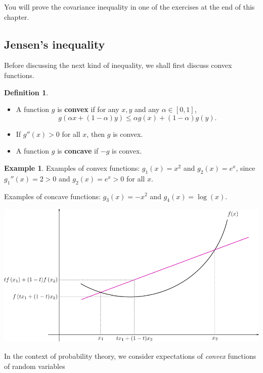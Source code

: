 \documentclass[
]{book}
\theoremstyle{definition}
\newtheorem{definition}{Definition}[chapter]
\theoremstyle{definition}
\newtheorem{example}{Example}[chapter]
\theoremstyle{definition}
\theoremstyle{definition}
\theoremstyle{remark}
\begin{document}
You will prove the covariance inequality in one of the exercises at the end of this chapter.

\hypertarget{jensens-inequality}{%
\subsection{Jensen's inequality}\label{jensens-inequality}}

Before discussing the next kind of inequality, we shall first discuss convex functions.

\begin{definition}

\begin{itemize}
\item
  A function \(g\) is \textbf{convex} if for any \(x,y\) and any
  \(\alpha \in [0,1]\),
  \[g(\alpha x + (1-\alpha)y) \leq \alpha g(x) + (1-\alpha)g(y).\]
\item
  If \(g''(x)>0\) for all \(x\), then \(g\) is convex.
\item
  A function \(g\) is \textbf{concave} if \(-g\) is convex.
\end{itemize}

\end{definition}

\begin{example}
Examples of convex functions: \(g_1(x) = x^2\) and \(g_2(x) = e^x\), since
\(g_1''(x) = 2>0\) and \(g_2(x)=e^x > 0\) for all \(x\).

Examples of concave functions: \(g_3(x) = -x^2\) and \(g_4(x) = \log(x)\).
\end{example}

\begin{center}\includegraphics[width=0.8\linewidth]{figure/01-jensen} \end{center}

In the context of probability theory, we consider expectations of \emph{convex} functions of random variables
\end{document}
